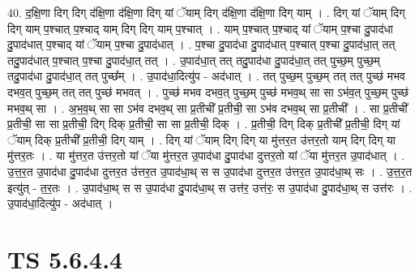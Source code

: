 \documentclass[17pt]{extarticle}
\begin{document}
40. द॒क्षि॒णा दिग् दिग् द॑क्षि॒णा द॑क्षि॒णा दिग् यां ॅयाम् दिग् द॑क्षि॒णा द॑क्षि॒णा दिग् याम् । . दिग् यां ॅयाम् दिग् दिग् याम् प॒श्चात् प॒श्चाद् याम् दिग् दिग् याम् प॒श्चात् । . याम् प॒श्चात् प॒श्चाद् यां ॅयाम् प॒श्चा दु॒पाद॑धा दु॒पाद॑धात् प॒श्चाद् यां ॅयाम् प॒श्चा दु॒पाद॑धात् । . प॒श्चा दु॒पाद॑धा दु॒पाद॑धात् प॒श्चात् प॒श्चा दु॒पाद॑धा॒त् तत् तदु॒पाद॑धात् प॒श्चात् प॒श्चा दु॒पाद॑धा॒त् तत् । . उ॒पाद॑धा॒त् तत् तदु॒पाद॑धा दु॒पाद॑धा॒त् तत् पुच्छ॒म् पुच्छ॒म् तदु॒पाद॑धा दु॒पाद॑धा॒त् तत् पुच्छ᳚म् । . उ॒पाद॑धा॒दित्यु॑प - अद॑धात् । . तत् पुच्छ॒म् पुच्छ॒म् तत् तत् पुच्छ॑ मभव दभव॒त् पुच्छ॒म् तत् तत् पुच्छ॑ मभवत् । . पुच्छ॑ मभव दभव॒त् पुच्छ॒म् पुच्छ॑ मभव॒थ् सा सा ऽभ॑व॒त् पुच्छ॒म् पुच्छ॑ मभव॒थ् सा । . अ॒भ॒व॒थ् सा सा ऽभ॑व दभव॒थ् सा प्र॒तीची᳚ प्र॒तीची॒ सा ऽभ॑व दभव॒थ् सा प्र॒तीची᳚ । . सा प्र॒तीची᳚ प्र॒तीची॒ सा सा प्र॒तीची॒ दिग् दिक् प्र॒तीची॒ सा सा प्र॒तीची॒ दिक् । . प्र॒तीची॒ दिग् दिक् प्र॒तीची᳚ प्र॒तीची॒ दिग् यां ॅयाम् दिक् प्र॒तीची᳚ प्र॒तीची॒ दिग् याम् । . दिग् यां ॅयाम् दिग् दिग् या मु॑त्तर॒त उ॑त्तर॒तो याम् दिग् दिग् या मु॑त्तर॒तः । . या मु॑त्तर॒त उ॑त्तर॒तो यां ॅया मु॑त्तर॒त उ॒पाद॑धा दु॒पाद॑धा दुत्तर॒तो यां ॅया मु॑त्तर॒त उ॒पाद॑धात् । . उ॒त्त॒र॒त उ॒पाद॑धा दु॒पाद॑धा दुत्तर॒त उ॑त्तर॒त उ॒पाद॑धा॒थ् स स उ॒पाद॑धा दुत्तर॒त उ॑त्तर॒त उ॒पाद॑धा॒थ् सः । . उ॒त्त॒र॒त इत्यु॑त् - त॒र॒तः । . उ॒पाद॑धा॒थ् स स उ॒पाद॑धा दु॒पाद॑धा॒थ् स उत्त॑र॒ उत्त॑रः॒ स उ॒पाद॑धा दु॒पाद॑धा॒थ् स उत्त॑रः । . उ॒पाद॑धा॒दित्यु॑प - अद॑धात् । \newline
\pagebreak
{}

\section{ TS 5.6.4.4 }
\end{document}
